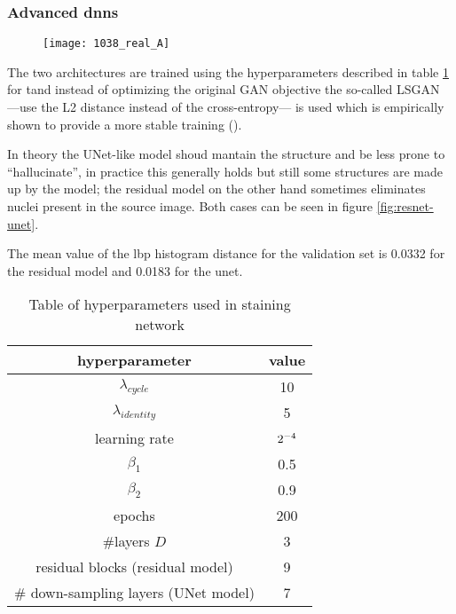 \documentclass[../main.tex]{subfiles}
\begin{document}
\subsubsection{Advanced \glspl{dnn}}

\begin{figure}
\centering
\texttt{[image: 1038\_real\_A]}
\caption{}
\label{}
\end{figure}

The two architectures are trained using the hyperparameters described
in table \ref{tab:hyperparameters} 
for tand instead of optimizing the
original GAN objective
the so-called LSGAN ---use the L2 distance instead of the cross-entropy---
is used which is empirically shown to provide a more
stable training (\cite{lsgan}).

In theory the UNet-like model shoud mantain the structure and be less prone
to ``hallucinate'', in practice this generally holds but still some structures
are made up by the model; the residual model on the other hand sometimes
eliminates nuclei present in the source image. Both cases can be seen in figure
\ref{fig:resnet-unet}.

The mean value of the \gls{lbp} histogram distance for the validation
set is 0.0332 for the residual model and 0.0183 for the unet.

\begin{table}
\centering
\begin{tabular}{cc}
\toprule
hyperparameter & value \\
\midrule
$\lambda_{cycle}$ & 10 \\
$\lambda_{identity}$ & 5 \\
learning rate & $2 \time 10^{-4}$ \\
$\beta_1$ & 0.5 \\
$\beta_2$ & 0.9 \\
epochs & 200 \\
\#layers $D$ & 3 \\
residual blocks (residual model) & 9 \\
\# down-sampling layers (UNet model) & 7 \\
\bottomrule
\end{tabular}
\caption{Table of hyperparameters used in staining network}
\label{tab:hyperparameters}
\end{table}
\end{document}
